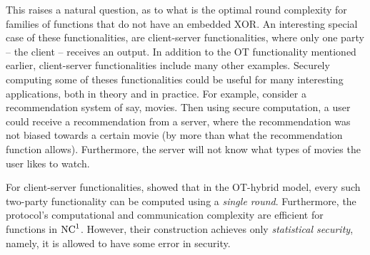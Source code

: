 \documentclass{llncs}
\begin{document}
This raises a natural question, as to what is the optimal round complexity for families of functions that do not have an embedded XOR. An interesting special case of these functionalities, are client-server functionalities, where only one party -- the client -- receives an output. 
In addition to the OT functionality mentioned earlier, client-server functionalities include many other examples. Securely computing some of theses functionalities could be useful for many interesting applications, both in theory and in practice. For example, consider a recommendation system of say, movies. Then using secure computation, a user could receive a recommendation from a server, where the recommendation was not biased towards a certain movie (by more than what the recommendation function allows). Furthermore, the server will not know what types of movies the user likes to watch.

For client-server functionalities, \citet{IKOPS11} showed that in the OT-hybrid model, every such two-party functionality can be computed using a \emph{single round}. Furthermore, the protocol's computational and communication complexity are efficient for functions in $\mathrm{NC}^1$. However, their construction achieves only \emph{statistical security}, namely, it is allowed to have some error in security. 
\end{document}
